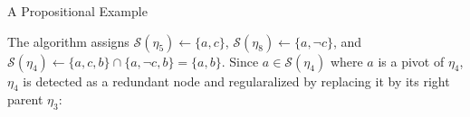 \documentclass[final]{beamer} %
\begin{document}
\begin{frame}{}
\begin{columns}
\begin{column}{0.48\textwidth}
\begin{block}{A Propositional Example}



The algorithm {\RPI} assigns $\mathcal{S}(\eta_5) \leftarrow \{a,c\}$, $\mathcal{S}(\eta_8)\leftarrow \{a, \neg c\}$, and
$\mathcal{S}(\eta_4) \leftarrow \{a,c,b\}\cap \{ a,\lnot c, b\} =  \{a,b\}$.
Since $a\in \mathcal{S}(\eta_4)$ where $a$ is a pivot of $\eta_4$, $\eta_4$ is detected as a redundant node and regularalized by replacing it by its right parent $\eta_3$:


\end{block}
\end{column}
\end{columns}
\end{frame}
\end{document}
